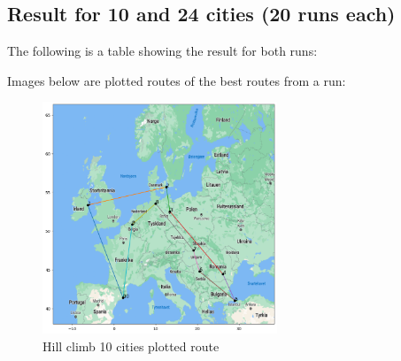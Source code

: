 \documentclass{article}
\begin{document}
    \subsection{Result for 10 and 24 cities (20 runs each)}

    The following is a table showing the result for both runs:

    \begin{table}[ht]
        \centering
        \caption{Hill Climbing results for 10 and 24 cities (20 runs each)}
    \end{table}
    

    Images below are plotted routes of the best routes from a run: 

    \begin{figure}[ht]
        \includegraphics[width=7cm]{images/hill_climb_10_cities.png}
        \centering
        \caption{Hill climb 10 cities plotted route}
    \end{figure}
\end{document}

